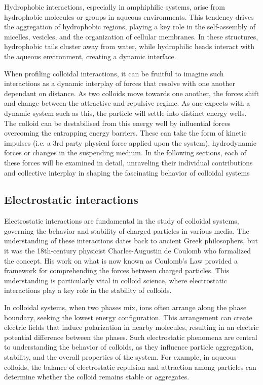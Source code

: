 Hydrophobic interactions, especially in amphiphilic systems, arise from hydrophobic molecules or groups in aqueous environments. This tendency drives the aggregation of hydrophobic regions, playing a key role in the self-assembly of micelles, vesicles, and the organization of cellular membranes. In these structures, hydrophobic tails cluster away from water, while hydrophilic heads interact with the aqueous environment, creating a dynamic interface. 

When profiling colloidal interactions, it can be fruitful to imagine such interactions as a dynamic interplay of forces that resolve with one another dependant on distance. As two colloids move towards one another, the forces shift and change between the attractive and repulsive regime. As one expects with a dynamic system such as this, the particle will settle into distinct energy wells. The colloid can be destabilised from this energy well by influential forces overcoming the entrapping energy barriers. These can take the form of kinetic impulses (i.e. a 3rd party physical force applied upon the system), hydrodynamic forces or changes in the suspending medium. In the following sections, each of these forces will be examined in detail, unraveling their individual contributions and collective interplay in shaping the fascinating behavior of colloidal systems


\subsection{Electrostatic interactions} %
Electrostatic interactions are fundamental in the study of colloidal systems, governing the behavior and stability of charged particles in various media. The understanding of these interactions dates back to ancient Greek philosophers, but it was the 18th-century physicist Charles-Augustin de Coulomb who formalized the concept. His work on what is now known as Coulomb's Law provided a framework for comprehending the forces between charged particles. This understanding is particularly vital in colloid science, where electrostatic interactions play a key role in the stability of colloids. \cite{halliday2013fundamentals}

In colloidal systems, when two phases mix, ions often arrange along the phase boundary, seeking the lowest energy configuration. This arrangement can create electric fields that induce polarization in nearby molecules, resulting in an electric potential difference between the phases. Such electrostatic phenomena are central to understanding the behavior of colloids, as they influence particle aggregation, stability, and the overall properties of the system. For example, in aqueous colloids, the balance of electrostatic repulsion and attraction among particles can determine whether the colloid remains stable or aggregates.

